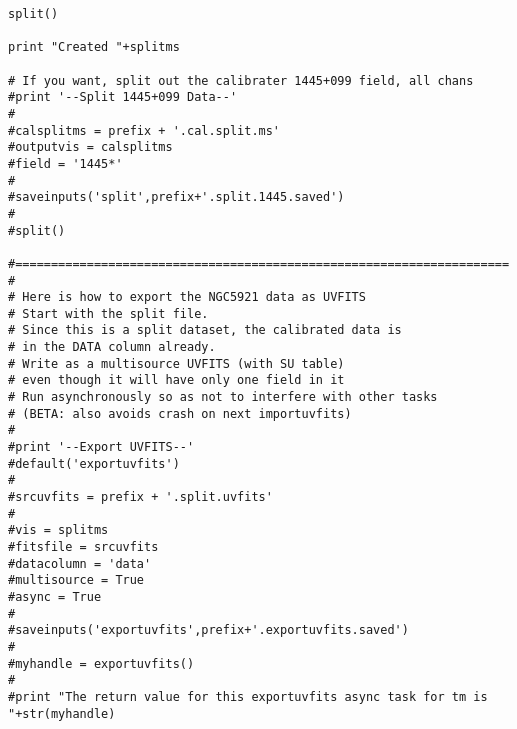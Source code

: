 \begin{verbatim}
split()

print "Created "+splitms

# If you want, split out the calibrater 1445+099 field, all chans
#print '--Split 1445+099 Data--'
#
#calsplitms = prefix + '.cal.split.ms'
#outputvis = calsplitms
#field = '1445*'
#
#saveinputs('split',prefix+'.split.1445.saved')
#
#split()

#=====================================================================
#
# Here is how to export the NGC5921 data as UVFITS
# Start with the split file.
# Since this is a split dataset, the calibrated data is
# in the DATA column already.
# Write as a multisource UVFITS (with SU table)
# even though it will have only one field in it
# Run asynchronously so as not to interfere with other tasks
# (BETA: also avoids crash on next importuvfits)
#
#print '--Export UVFITS--'
#default('exportuvfits')
#
#srcuvfits = prefix + '.split.uvfits'
#
#vis = splitms
#fitsfile = srcuvfits
#datacolumn = 'data'
#multisource = True
#async = True
#
#saveinputs('exportuvfits',prefix+'.exportuvfits.saved')
#
#myhandle = exportuvfits()
#
#print "The return value for this exportuvfits async task for tm is "+str(myhandle)

\end{verbatim}
